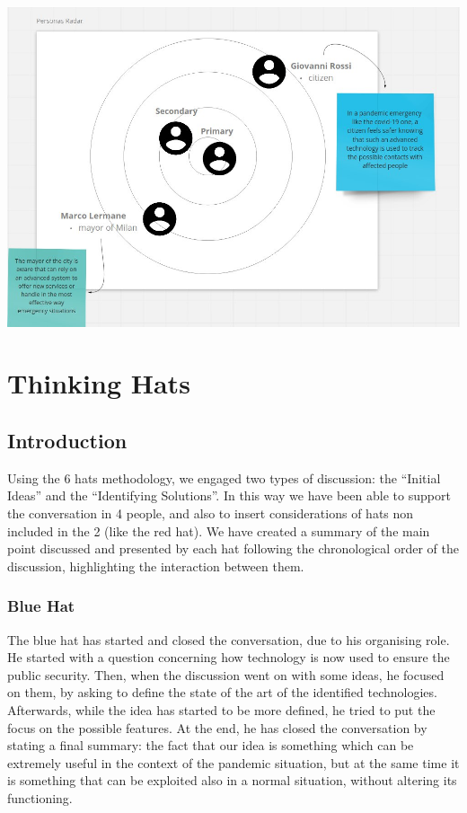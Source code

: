 \documentclass[../main.tex]{subfiles}
\begin{document}
    \includegraphics[scale = 0.5]{assets/radar.jpg}

    \chapter{Thinking Hats}\label{ch:thinking-hats}
    \section{Introduction}\label{sec:introduction2}
    Using the 6 hats methodology, we engaged two types of discussion: the “Initial Ideas” and the “Identifying Solutions”.
    In this way we have been able to support the conversation in 4 people, and also to insert considerations of hats non included in the 2 (like the red hat).
    We have created a summary of the main point discussed and presented by each hat following the chronological order of the discussion, highlighting the interaction
    between them.

    \subsection{Blue Hat}\label{subsec:blue-hat}
    The blue hat has started and closed the conversation, due to his organising role.
    He started with a question concerning how technology is now used to ensure the public security.
    Then, when the discussion went on with some ideas, he focused on them, by asking to define the state of the art of the identified technologies.
    Afterwards, while the idea has started to be more defined, he tried to put the focus on the possible features.
    At the end, he has closed the conversation by stating a final summary: the fact that our idea is something which can be extremely useful in the context of
    the pandemic situation, but at the same time it is something that can be exploited also in a normal situation, without altering its functioning.
\end{document}
